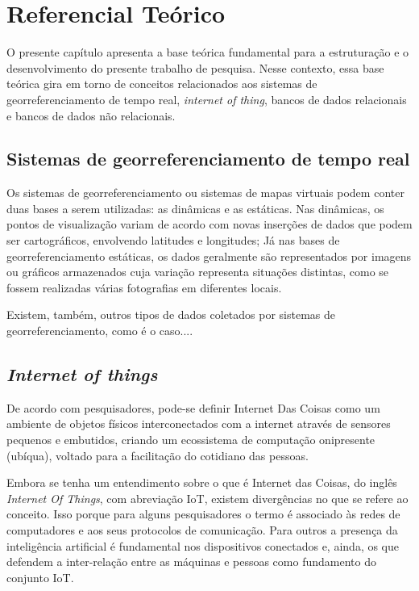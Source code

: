 \chapter{Referencial Teórico}

O presente capítulo apresenta a base teórica fundamental para a estruturação e o desenvolvimento do presente trabalho de pesquisa. Nesse contexto, essa base teórica gira em torno de conceitos relacionados aos sistemas de georreferenciamento de tempo real, \textit{internet of thing}, bancos de dados relacionais e bancos de dados não relacionais.

\section{Sistemas de georreferenciamento de tempo real}

Os sistemas de georreferenciamento ou sistemas de mapas virtuais podem conter duas bases a serem utilizadas: as dinâmicas e as estáticas\cite{MacEachren}. Nas dinâmicas, os pontos de visualização variam de acordo com novas inserções de dados que podem ser cartográficos, envolvendo latitudes e longitudes; Já nas bases de georreferenciamento estáticas, os dados geralmente são representados por imagens ou gráficos armazenados cuja variação representa situações distintas\cite{MacEachren}, como se fossem realizadas várias fotografias em diferentes locais.

Existem, também, outros tipos de dados coletados por sistemas de georreferenciamento, como é o caso....
\section {\textit{Internet of things}}
De acordo com pesquisadores, pode-se definir Internet Das Coisas como um ambiente de objetos físicos interconectados com a internet através de sensores pequenos e embutidos, criando um ecossistema de computação onipresente (ubíqua), voltado para a facilitação do cotidiano das pessoas\cite{Magrani-2018}.

Embora se tenha um entendimento sobre o que é Internet das Coisas, do inglês \textit{Internet Of Things}, com abreviação IoT, existem divergências no que se refere ao conceito. Isso porque para alguns pesquisadores o termo é associado às redes de computadores e aos seus protocolos de comunicação. Para outros a presença da inteligência artificial é fundamental nos dispositivos conectados e, ainda, os que defendem a inter-relação entre as máquinas e pessoas como fundamento do conjunto IoT\cite{Magrani-2018}.

